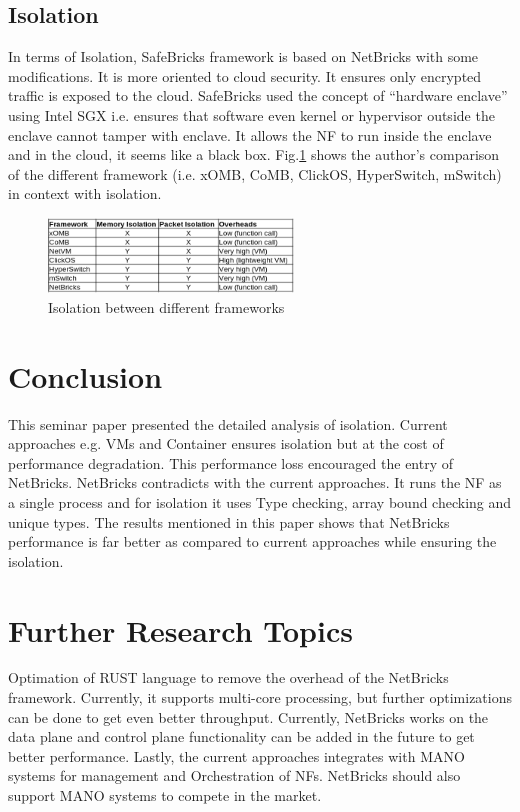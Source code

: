 \documentclass[10pt, a4paper, conference]{IEEEtran}
\begin{document}
\subsection{Isolation}
In terms of Isolation, SafeBricks \cite{Poddar2018} framework is based on NetBricks with some modifications. It is more oriented to cloud security. It ensures only encrypted traffic is exposed to the cloud. SafeBricks used the concept of “hardware enclave” using Intel SGX i.e. ensures that software even kernel or hypervisor outside the enclave cannot tamper with enclave. It allows the NF to run inside the enclave and in the cloud, it seems like a black box. Fig.\ref{key16} shows the author’s comparison of the different framework (i.e. xOMB\cite{Anderson2012}, CoMB\cite{Sekar}, ClickOS\cite{Martins2014}, HyperSwitch\cite{Ram2013}, mSwitch\cite{Honda2015}) in context with isolation.
\begin{figure}
	\centering
	\includegraphics[width=65mm]{figures/fig14}
	\caption{Isolation between different frameworks\cite{Panda2016}}
	\label{key16}
\end{figure}
\section{Conclusion}
This seminar paper presented the detailed analysis of isolation. Current approaches e.g. VMs and Container ensures isolation but at the cost of performance degradation. This performance loss encouraged the entry of NetBricks. NetBricks contradicts with the current approaches. It runs the NF as a single process and for isolation it uses Type checking, array bound checking and unique types. The results mentioned in this paper shows that NetBricks performance is far better as compared to current approaches while ensuring the isolation.
\section{Further Research Topics}
 Optimation of RUST language to remove the overhead of the NetBricks framework. Currently, it supports multi-core processing, but further optimizations can be done to get even better throughput. Currently, NetBricks works on the data plane and control plane functionality can be added in the future to get better performance. Lastly, the current approaches integrates with MANO systems for management and Orchestration of NFs. NetBricks should also support MANO systems to compete in the market.
\label{sec:conclusion}







\end{document}
